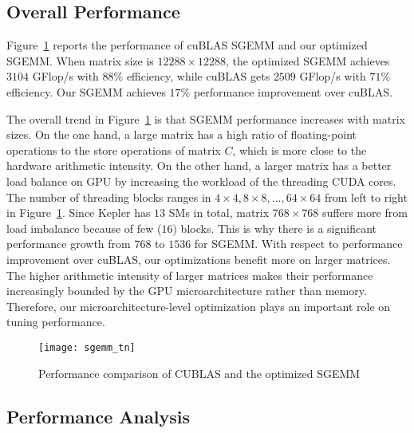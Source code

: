 \subsection{Overall Performance}
Figure~\ref{fig:sgemm_tn} reports the performance of cuBLAS SGEMM and our optimized SGEMM.
When matrix size is $12288\times12288$, the optimized SGEMM achieves $3104$ GFlop/s with $88\%$ efficiency, while cuBLAS gets $2509$ GFlop/s with $71\%$ efficiency. 
Our SGEMM achieves $17\%$ performance improvement over cuBLAS.

The overall trend in Figure~\ref{fig:sgemm_tn} is that SGEMM performance increases with matrix sizes. 
On the one hand, a large matrix has a high ratio of 
floating-point operations to the store operations of matrix $C$, which is more close to the hardware arithmetic intensity. 
On the other hand, a larger matrix has a better load balance on GPU by increasing the workload of the threading CUDA
cores.
The number of threading blocks ranges in $4 \times 4, 8 \times 8, \dots, 64 \times 64$ from left to right in Figure~\ref{fig:sgemm_tn}.
Since Kepler has $13$ SMs in total, matrix $768\times 768$ suffers more from load imbalance because of few ($16$) blocks. 
This is why there is a significant performance growth from $768$ to $1536$ for SGEMM. 
With respect to performance improvement over cuBLAS, our optimizations benefit more on larger matrices. 
The higher arithmetic intensity of larger matrices makes their performance increasingly bounded by the GPU microarchitecture rather than memory. 
Therefore, our microarchitecture-level optimization plays an important role on tuning 
performance.

\begin{figure}[htbp]
\begin{center}
\texttt{[image: sgemm\_tn]}
\caption{Performance comparison of CUBLAS and the optimized SGEMM }
\label{fig:sgemm_tn}
\end{center}
\end{figure}

\subsection{Performance Analysis}

